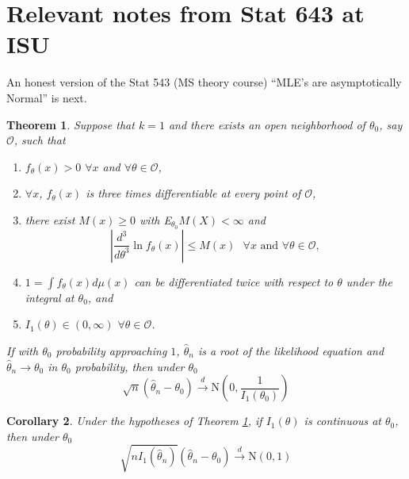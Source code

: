 \documentclass{article}
\newtheorem{theorem}{Theorem}
\newtheorem{corollary}[theorem]{Corollary}
\begin{document}
\clearpage
\section{Relevant notes from Stat 643 at ISU}
\setcounter{theorem}{172}
An honest version of the Stat 543 (MS theory  course) ``MLE's are asymptotically Normal'' is next.

\begin{theorem}
\label{MLENormal}Suppose that $k=1$ and there exists an open neighborhood of
$\theta_{0}$, say $\mathcal{O}$, such that

\begin{enumerate}
\item $f_{\theta}\left(  x\right)  >0$ $\forall x$ and $\forall\theta
\in\mathcal{O}$,

\item $\forall x$, $f_{\theta}\left(  x\right)  $ is three times
differentiable at every point of $\mathcal{O}$,

\item there exist $M\left(  x\right)  \geq0$ with E$_{\theta_{0}}M\left(
X\right)  <\infty$ and%
\[
\left\vert \frac{d^{3}}{d\theta^{3}}\ln f_{\theta}\left(  x\right)
\right\vert \leq M\left(  x\right)  \text{ }\forall x\text{ and }\forall
\theta\in\mathcal{O},
\]


\item $1=\int f_{\theta}\left(  x\right)  d\mu\left(  x\right)  $ can be
differentiated twice with respect to $\theta$ under the integral at
$\theta_{0}$, and

\item $I_{1}\left(  \theta\right)  \in\left(  0,\infty\right)  $
$\forall\theta\in\mathcal{O}$.
\end{enumerate}

\noindent If with $\theta_{0}$ probability approaching $1$, $\hat{\theta}_{n}$
is a root of the likelihood equation and $\hat{\theta}_{n}\rightarrow
\theta_{0}$ in $\theta_{0}$ probability, then under $\theta_{0}$%
\[
\sqrt{n}\left(  \hat{\theta}_{n}-\theta_{0}\right)  \overset{d}{\rightarrow
}\text{N}\left(  0,\frac{1}{I_{1}\left(  \theta_{0}\right)  }\right)
\]

\end{theorem}

\begin{corollary}
\label{MLENormal1}Under the hypotheses of Theorem \ref{MLENormal}, if
$I_{1}\left(  \theta\right)  $ is continuous at $\theta_{0}$, then under
$\theta_{0}$%
\[
\sqrt{nI_{1}\left(  \hat{\theta}_{n}\right)  }\left(  \hat{\theta}_{n}%
-\theta_{0}\right)  \overset{d}{\rightarrow}\text{N}\left(  0,1\right)
\]

\end{corollary}
\end{document}
